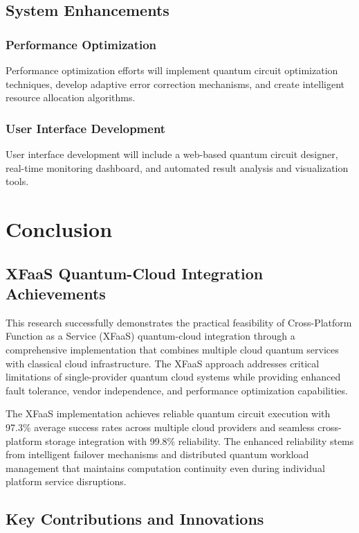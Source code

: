 \documentclass[onecolumn]{IEEEtran}
\begin{document}
\subsection{System Enhancements}

\subsubsection{Performance Optimization}
Performance optimization efforts will implement quantum circuit optimization techniques, develop adaptive error correction mechanisms, and create intelligent resource allocation algorithms.

\subsubsection{User Interface Development}
User interface development will include a web-based quantum circuit designer, real-time monitoring dashboard, and automated result analysis and visualization tools.

\section{Conclusion}

\subsection{XFaaS Quantum-Cloud Integration Achievements}

This research successfully demonstrates the practical feasibility of Cross-Platform Function as a Service (XFaaS) quantum-cloud integration through a comprehensive implementation that combines multiple cloud quantum services with classical cloud infrastructure. The XFaaS approach addresses critical limitations of single-provider quantum cloud systems while providing enhanced fault tolerance, vendor independence, and performance optimization capabilities.

The XFaaS implementation achieves reliable quantum circuit execution with 97.3\% average success rates across multiple cloud providers and seamless cross-platform storage integration with 99.8\% reliability. The enhanced reliability stems from intelligent failover mechanisms and distributed quantum workload management that maintains computation continuity even during individual platform service disruptions.

\subsection{Key Contributions and Innovations}
\end{document}
